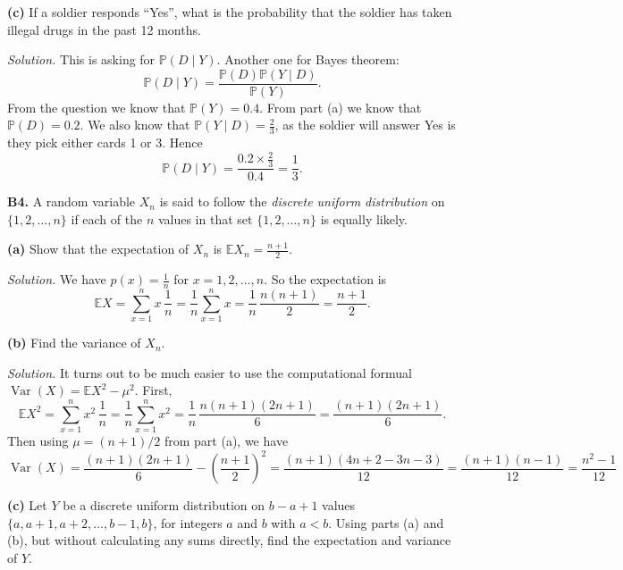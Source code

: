 \documentclass[
  a4paper,
]{book}
\theoremstyle{definition}
\theoremstyle{definition}
\theoremstyle{definition}
\theoremstyle{definition}
\theoremstyle{remark}
\begin{document}
\textbf{(c)} If a soldier responds ``Yes'', what is the probability that the soldier has taken illegal drugs in the past 12 months.

\begin{myanswers}
\emph{Solution.}
This is asking for \(\mathbb P(D \mid Y)\). Another one for Bayes theorem:
\[ \mathbb P(D \mid Y) = \frac{\mathbb P(D) \mathbb P(Y \mid D)}{\mathbb P(Y)} . \]
From the question we know that \(\mathbb P(Y) = 0.4\). From part (a) we know that \(\mathbb P(D) = 0.2\). We also know that \(\mathbb P(Y \mid D) = \frac23\), as the soldier will answer Yes is they pick either cards 1 or 3. Hence
\[ \mathbb P(D \mid Y) = \frac{0.2 \times \frac23}{0.4} = \frac13 . \]

\end{myanswers}

\textbf{B4.} A random variable \(X_n\) is said to follow the \emph{discrete uniform distribution} on \(\{1, 2, \dots, n\}\) if each of the \(n\) values in that set \(\{1,2,\dots,n\}\) is equally likely.

\textbf{(a)} Show that the expectation of \(X_n\) is \(\mathbb EX_n = \displaystyle\frac{n+1}{2}\).

\begin{myanswers}
\emph{Solution.}
We have \(p(x) = \frac1n\) for \(x = 1, 2, \dots, n\). So the expectation is
\[ \mathbb EX = \sum_{x=1}^n x\,\frac{1}{n} = \frac{1}{n} \sum_{x = 1}^n x = \frac{1}{n}\, \frac{n(n+1)}{2} = \frac{n+1}{2} . \]

\end{myanswers}

\textbf{(b)} Find the variance of \(X_n\).

\begin{myanswers}
\emph{Solution.}
It turns out to be much easier to use the computational formual \(\operatorname{Var}(X) = \mathbb EX^2 - \mu^2\). First,
\[ \mathbb EX^2 = \sum_{x=1}^n x^2 \,\frac{1}{n}  = \frac{1}{n} \sum_{x = 1}^n x^2 = \frac{1}{n}\,\frac{n(n+1)(2n+1)}{6} = \frac{(n+1)(2n + 1)}{6} . \]
Then using \(\mu = (n+1)/2\) from part (a), we have
\[ \operatorname{Var}(X) =  \frac{(n+1)(2n + 1)}{6} - \left(\frac{n+1}{2}\right)^2 = \frac{(n+1)(4n + 2 - 3n -3)}{12} = \frac{(n+1)(n-1)}{12} = \frac{n^2 - 1}{12}  \]

\end{myanswers}

\textbf{(c)} Let \(Y\) be a discrete uniform distribution on \(b - a + 1\) values \(\{a, a+1, a+2, \dots, b-1, b\}\), for integers \(a\) and \(b\) with \(a<b\). Using parts (a) and (b), but without calculating any sums directly, find the expectation and variance of \(Y\).
\end{document}
